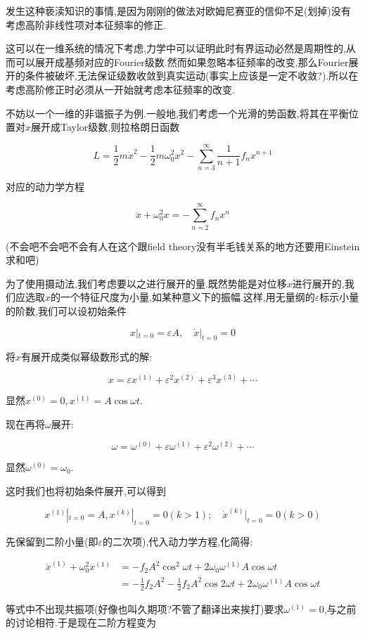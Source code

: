 \documentclass[UTF8]{article}
\begin{document}
	发生这种亵渎知识的事情,是因为刚刚的做法对欧姆尼赛亚的信仰不足(划掉)没有考虑高阶非线性项对本征频率的修正.
	
	这可以在一维系统的情况下考虑,力学中可以证明此时有界运动必然是周期性的,从而可以展开成基频对应的Fourier级数.然而如果忽略本征频率的改变,那么Fourier展开的条件被破坏,无法保证级数收敛到真实运动(事实上应该是一定不收敛?).所以在考虑高阶修正时必须从一开始就考虑本征频率的改变.
	
	不妨以一个一维的非谐振子为例.一般地,我们考虑一个光滑的势函数,将其在平衡位置对$x$展开成Taylor级数,则拉格朗日函数
	
	\[L=\frac{1}{2}m\dot{x}^2-\frac{1}{2}m\omega_0^2x^2-\sum_{n=3}^{\infty}\frac{1}{n+1}f_nx^{n+1}\]
	
	对应的动力学方程
	
	\[\ddot{x}+\omega_0^2x=-\sum_{n=2}^{\infty}f_nx^n\]
	
	(不会吧不会吧不会有人在这个跟field theory没有半毛钱关系的地方还要用Einstein求和吧)
	
	为了使用摄动法,我们考虑要以之进行展开的量.既然势能是对位移$x$进行展开的,我们应选取$x$的一个特征尺度为小量,如某种意义下的振幅.这样,用无量纲的$\varepsilon$标示小量的阶数,我们可以设初始条件
	
	\[x|_{t=0}=\varepsilon A,\quad\dot{x}|_{t=0}=0\]
	
	将$x$有展开成类似幂级数形式的解:
	
	\[x=\varepsilon x^{(1)}+\varepsilon^2 x^{(2)}+\varepsilon^3 x^{(3)}+\cdots\]
	
	显然$x^{(0)}=0,x^{(1)}=A\cos \omega t$.
	
	现在再将$\omega$展开:
	
	\[\omega=\omega^{(0)}+\varepsilon\omega^{(1)}+\varepsilon^2\omega^{(2)}+\cdots\]
	
	显然$\omega^{(0)}=\omega_0$.
	
	这时我们也将初始条件展开,可以得到
	
	\[x^{(1)}|_{t=0}=A,x^{(k)}|_{t=0}=0(k>1);\quad \dot{x}^{(k)}|_{t=0}=0(k>0)\]
	
	先保留到二阶小量(即$\varepsilon$的二次项),代入动力学方程,化简得:
	
	\[
		\begin{aligned}
			\ddot{x}^{(1)}+\omega_0^2 x^{(1)}
			&=-f_2A^2\cos^2\omega t+2\omega_0\omega^{(1)}A\cos\omega t\\
			&=-\frac{1}{2}f_2A^2-\frac{1}{2}f_2A^2\cos2\omega t+2\omega_0\omega^{(1)}A\cos\omega t
		\end{aligned}
	\]
	
	等式中不出现共振项(好像也叫久期项?不管了翻译出来挨打)要求$\omega^{(1)}=0$,与之前的讨论相符.于是现在二阶方程变为	
	
\end{document}
